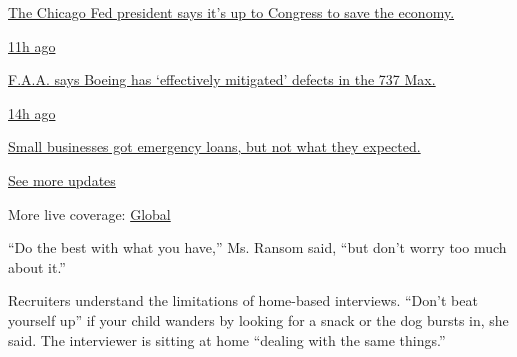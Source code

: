 \href{https://www.nytimes3xbfgragh.onion/live/2020/08/03/business/stock-market-today-coronavirus?action=click\&pgtype=Article\&state=default\&region=MAIN_CONTENT_1\&context=storylines_live_updates\#the-chicago-fed-president-says-its-up-to-congress-to-save-the-economy}{The
Chicago Fed president says it's up to Congress to save the economy.}

\href{https://www.nytimes3xbfgragh.onion/live/2020/08/03/business/stock-market-today-coronavirus?action=click\&pgtype=Article\&state=default\&region=MAIN_CONTENT_1\&context=storylines_live_updates\#faa-says-boeing-has-effectively-mitigated-defects-in-the-737-max}{11h
ago}

\href{https://www.nytimes3xbfgragh.onion/live/2020/08/03/business/stock-market-today-coronavirus?action=click\&pgtype=Article\&state=default\&region=MAIN_CONTENT_1\&context=storylines_live_updates\#faa-says-boeing-has-effectively-mitigated-defects-in-the-737-max}{F.A.A.
says Boeing has `effectively mitigated' defects in the 737 Max.}

\href{https://www.nytimes3xbfgragh.onion/live/2020/08/03/business/stock-market-today-coronavirus?action=click\&pgtype=Article\&state=default\&region=MAIN_CONTENT_1\&context=storylines_live_updates\#small-businesses-got-emergency-loans-but-not-what-they-expected}{14h
ago}

\href{https://www.nytimes3xbfgragh.onion/live/2020/08/03/business/stock-market-today-coronavirus?action=click\&pgtype=Article\&state=default\&region=MAIN_CONTENT_1\&context=storylines_live_updates\#small-businesses-got-emergency-loans-but-not-what-they-expected}{Small
businesses got emergency loans, but not what they expected.}

\href{https://www.nytimes3xbfgragh.onion/live/2020/08/03/business/stock-market-today-coronavirus?action=click\&pgtype=Article\&state=default\&region=MAIN_CONTENT_1\&context=storylines_live_updates}{See
more updates}

More live coverage:
\href{https://www.nytimes3xbfgragh.onion/2020/08/03/world/coronavirus-covid-19.html?action=click\&pgtype=Article\&state=default\&region=MAIN_CONTENT_1\&context=storylines_live_updates}{Global}

``Do the best with what you have,'' Ms. Ransom said, ``but don't worry
too much about it.''

Recruiters understand the limitations of home-based interviews. ``Don't
beat yourself up'' if your child wanders by looking for a snack or the
dog bursts in, she said. The interviewer is sitting at home ``dealing
with the same things.''


